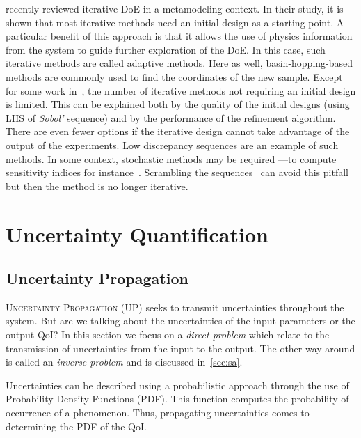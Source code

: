 \citet{Liu2018} recently reviewed iterative DoE in a metamodeling context. In their study, it is shown that most iterative methods need an initial design as a starting point. A particular benefit of this approach is that it allows the use of physics information from the system to guide further exploration of the DoE. In this case, such iterative methods are called adaptive methods. Here as well, basin-hopping-based methods are commonly used to find the coordinates of the new sample. Except for some work in~\citep{Crombecq2011}, the number of iterative methods not requiring an initial design is limited. This can be explained both by the quality of the initial designs (using LHS of \emph{Sobol'} sequence) and by the performance of the refinement algorithm. There are even fewer options if the iterative design cannot take advantage of the output of the experiments. Low discrepancy sequences are an example of such methods. In some context, stochastic methods may be required ---\thinspace to compute sensitivity indices for instance~\citep{Saltelli2010}. Scrambling the sequences~\citep{Owen1998} can avoid this pitfall but then the method is no longer iterative.

\section{Uncertainty Quantification}\label{sec:uq}

\subsection{Uncertainty Propagation}\label{sec:up}
\lettrine{U}{ncertainty Propagation} (UP) seeks to transmit uncertainties throughout the system. But are we talking about the uncertainties of the input parameters or the output QoI? In this section we focus on a \emph{direct problem} which relate to the transmission of uncertainties from the input to the output. The other way around is called an \emph{inverse problem} and is discussed in~\cref{sec:sa}.

Uncertainties can be described using a probabilistic approach through the use of Probability Density Functions (PDF). This function computes the probability of occurrence of a phenomenon. Thus, propagating uncertainties comes to determining the PDF of the QoI.

